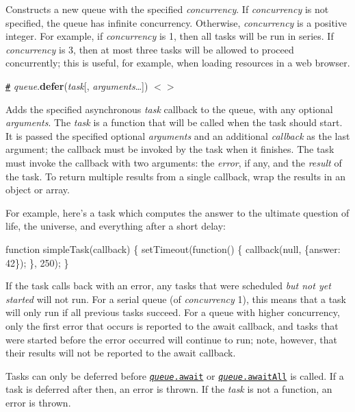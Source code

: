 Constructs a new queue with the specified {\itshape concurrency}. If {\itshape concurrency} is not specified, the queue has infinite concurrency. Otherwise, {\itshape concurrency} is a positive integer. For example, if {\itshape concurrency} is 1, then all tasks will be run in series. If {\itshape concurrency} is 3, then at most three tasks will be allowed to proceed concurrently; this is useful, for example, when loading resources in a web browser.

\href{#queue_defer}{\tt \#} {\itshape queue}.{\bfseries defer}({\itshape task}\mbox{[}, {\itshape arguments}…\mbox{]}) \href{https://github.com/d3/d3-queue/blob/master/src/queue.js#L20}{\tt $<$$>$}

Adds the specified asynchronous {\itshape task} callback to the queue, with any optional {\itshape arguments}. The {\itshape task} is a function that will be called when the task should start. It is passed the specified optional {\itshape arguments} and an additional {\itshape callback} as the last argument; the callback must be invoked by the task when it finishes. The task must invoke the callback with two arguments\+: the {\itshape error}, if any, and the {\itshape result} of the task. To return multiple results from a single callback, wrap the results in an object or array.

For example, here’s a task which computes the answer to the ultimate question of life, the universe, and everything after a short delay\+:


\begin{DoxyCode}
function simpleTask(callback) \{
  setTimeout(function() \{
    callback(null, \{answer: 42\});
  \}, 250);
\}
\end{DoxyCode}


If the task calls back with an error, any tasks that were scheduled {\itshape but not yet started} will not run. For a serial queue (of {\itshape concurrency} 1), this means that a task will only run if all previous tasks succeed. For a queue with higher concurrency, only the first error that occurs is reported to the await callback, and tasks that were started before the error occurred will continue to run; note, however, that their results will not be reported to the await callback.

Tasks can only be deferred before \href{#queue_await}{\tt {\itshape queue}.await} or \href{#queue_awaitAll}{\tt {\itshape queue}.await\+All} is called. If a task is deferred after then, an error is thrown. If the {\itshape task} is not a function, an error is thrown.

